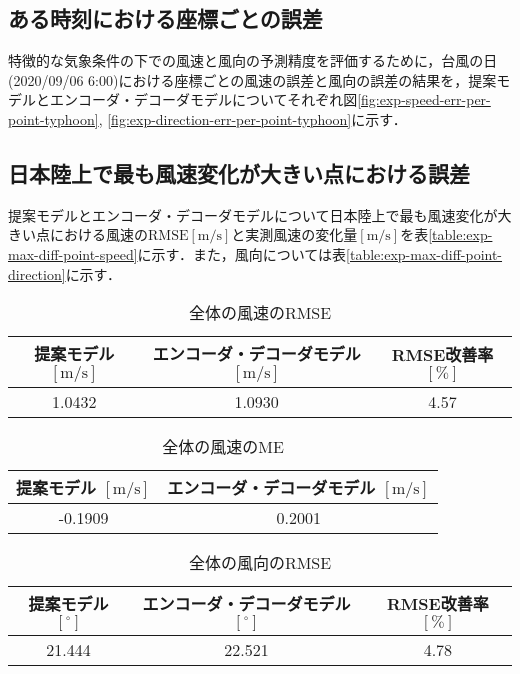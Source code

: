 \subsection{ある時刻における座標ごとの誤差 \label{subsection:exp-results-per-point-at-time}}
特徴的な気象条件の下での風速と風向の予測精度を評価するために，台風の日(2020/09/06 6:00)における座標ごとの風速の誤差と風向の誤差の結果を，提案モデルとエンコーダ・デコーダモデルについてそれぞれ図\ref{fig:exp-speed-err-per-point-typhoon}, \ref{fig:exp-direction-err-per-point-typhoon}に示す．

\subsection{日本陸上で最も風速変化が大きい点における誤差 \label{subsec:exp-results-at-max-diff-point}}
提案モデルとエンコーダ・デコーダモデルについて日本陸上で最も風速変化が大きい点における風速の$\mathrm{RMSE[m/s]}$と実測風速の変化量$\mathrm{[m/s]}$を表\ref{table:exp-max-diff-point-speed}に示す．また，風向については表\ref{table:exp-max-diff-point-direction}に示す．

\begin{table}[bp]
  \caption{全体の風速のRMSE}
  \label{table:exp-total-rmse}
  \centering
  \begin{tabular}{ccc}
    \hline
    提案モデル $\mathrm{[m/s]}$ & エンコーダ・デコーダモデル $\mathrm{[m/s]}$ & RMSE改善率 $\mathrm{[\%]}$ \\
    \hline
    1.0432 & 1.0930 & 4.57 \\
    \hline
  \end{tabular}
\end{table}

\begin{table}[bp]
  \caption{全体の風速のME}
  \label{table:exp-total-me}
  \centering
  \begin{tabular}{cc}
    \hline
    提案モデル $\mathrm{[m/s]}$ & エンコーダ・デコーダモデル $\mathrm{[m/s]}$ \\
    \hline
    -0.1909 & 0.2001 \\
    \hline
  \end{tabular}
\end{table}

\begin{table}[bp]
  \caption{全体の風向のRMSE}
  \label{table:exp-total-direction-rmse}
  \centering
  \begin{tabular}{ccc}
    \hline
    提案モデル $\mathrm{[^\circ]}$ & エンコーダ・デコーダモデル $\mathrm{[^\circ]}$ & RMSE改善率 $\mathrm{[\%]}$ \\
    \hline
    21.444 & 22.521 & 4.78 \\
    \hline
  \end{tabular}
\end{table}

